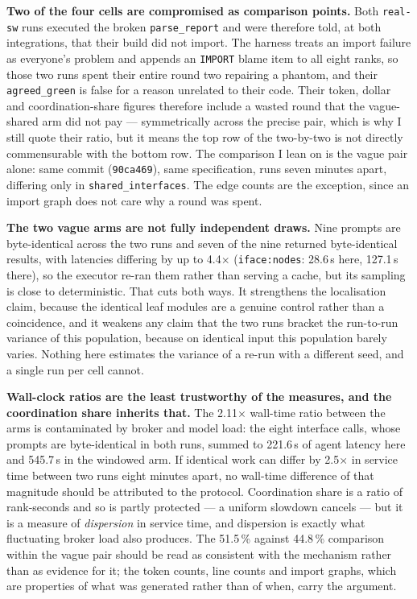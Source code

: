 \documentclass[11pt]{article}
\begin{document}
\textbf{Two of the four cells are compromised as comparison points.} Both \texttt{real-sw} runs
executed the broken \texttt{parse\_report} and were therefore told, at both integrations, that
their build did not import. The harness treats an import failure as everyone's problem and appends
an \texttt{IMPORT} blame item to all eight ranks, so those two runs spent their entire round two
repairing a phantom, and their \texttt{agreed\_green} is false for a reason unrelated to their
code. Their token, dollar and coordination-share figures therefore include a wasted round that the
vague-shared arm did not pay --- symmetrically across the precise pair, which is why I still quote
their ratio, but it means the top row of the two-by-two is not directly commensurable with the
bottom row. The comparison I lean on is the vague pair alone: same commit (\texttt{90ca469}), same
specification, runs seven minutes apart, differing only in \texttt{shared\_interfaces}. The edge
counts are the exception, since an import graph does not care why a round was spent.

\textbf{The two vague arms are not fully independent draws.} Nine prompts are byte-identical
across the two runs and seven of the nine returned byte-identical results, with latencies
differing by up to 4.4$\times$ (\texttt{iface:nodes}: 28.6\,s here, 127.1\,s there), so the
executor re-ran them rather than serving a cache, but its sampling is close to deterministic. That
cuts both ways. It strengthens the localisation claim, because the identical leaf modules are a
genuine control rather than a coincidence, and it weakens any claim that the two runs bracket the
run-to-run variance of this population, because on identical input this population barely varies.
Nothing here estimates the variance of a re-run with a different seed, and a single run per cell
cannot.

\textbf{Wall-clock ratios are the least trustworthy of the measures, and the coordination share
inherits that.} The 2.11$\times$ wall-time ratio between the arms is contaminated by broker and
model load: the eight interface calls, whose prompts are byte-identical in both runs, summed to
221.6\,s of agent latency here and 545.7\,s in the windowed arm. If identical work can differ by
2.5$\times$ in service time between two runs eight minutes apart, no wall-time difference of that
magnitude should be attributed to the protocol. Coordination share is a ratio of rank-seconds and
so is partly protected --- a uniform slowdown cancels --- but it is a measure of \emph{dispersion}
in service time, and dispersion is exactly what fluctuating broker load also produces. The 51.5\,\%
against 44.8\,\% comparison within the vague pair should be read as consistent with the mechanism
rather than as evidence for it; the token counts, line counts and import graphs, which are
properties of what was generated rather than of when, carry the argument.
\end{document}
